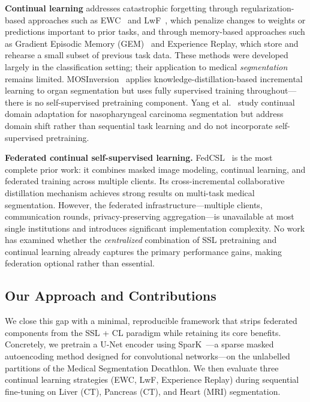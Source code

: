 \documentclass[conference]{IEEEtran}
\begin{document}
\textbf{Continual learning} addresses catastrophic forgetting through regularization-based approaches such as EWC~\cite{kirkpatrick2017ewc} and LwF~\cite{li2016lwf}, which penalize changes to weights or predictions important to prior tasks, and through memory-based approaches such as Gradient Episodic Memory (GEM)~\cite{lopezpaz2017gem} and Experience Replay, which store and rehearse a small subset of previous task data. These methods were developed largely in the classification setting; their application to medical \emph{segmentation} remains limited. MOSInversion~\cite{kim2025mosinversion} applies knowledge-distillation-based incremental learning to organ segmentation but uses fully supervised training throughout—there is no self-supervised pretraining component. Yang et al.~\cite{yang2025continual} study continual domain adaptation for nasopharyngeal carcinoma segmentation but address domain shift rather than sequential task learning and do not incorporate self-supervised pretraining.

\textbf{Federated continual self-supervised learning.} FedCSL~\cite{fedcsl2025} is the most complete prior work: it combines masked image modeling, continual learning, and federated training across multiple clients. Its cross-incremental collaborative distillation mechanism achieves strong results on multi-task medical segmentation. However, the federated infrastructure—multiple clients, communication rounds, privacy-preserving aggregation—is unavailable at most single institutions and introduces significant implementation complexity. No work has examined whether the \emph{centralized} combination of SSL pretraining and continual learning already captures the primary performance gains, making federation optional rather than essential.

\subsection{Our Approach and Contributions}

We close this gap with a minimal, reproducible framework that strips federated components from the SSL + CL paradigm while retaining its core benefits. Concretely, we pretrain a U-Net encoder using SparK~\cite{tian2023spark}—a sparse masked autoencoding method designed for convolutional networks—on the unlabelled partitions of the Medical Segmentation Decathlon. We then evaluate three continual learning strategies (EWC, LwF, Experience Replay) during sequential fine-tuning on Liver (CT), Pancreas (CT), and Heart (MRI) segmentation.
\end{document}
